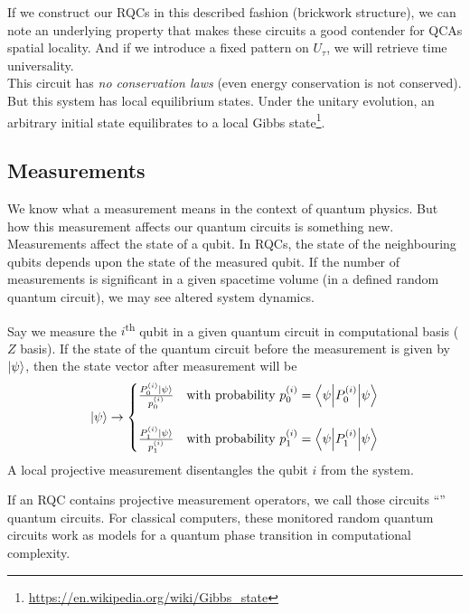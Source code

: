 \documentclass[11pt, oneside, listof=totoc]{scrbook}
\renewcommand{\u}{0}
\renewcommand{\d}{1}
\begin{document}
If we construct our RQCs in this described fashion (\ie brickwork structure), we can note an underlying property that makes these circuits a good contender for QCAs \ie spatial locality. And if we introduce a fixed pattern on \(U_\tau\), we will retrieve time universality.\\

This circuit has \emph{no conservation laws} (even energy conservation is not conserved). But this system has local equilibrium states. Under the unitary evolution, an arbitrary initial state equilibrates to a local Gibbs state\footnote{\url{https://en.wikipedia.org/wiki/Gibbs_state}}.

\subsection{Measurements}\label{ssec:measurement}

We know what a measurement means in the context of quantum physics. But how this measurement affects our quantum circuits is something new. Measurements affect the state of a qubit. In RQCs, the state of the neighbouring qubits depends upon the state of the measured qubit. If the number of measurements is significant in a given spacetime volume (\ie in a defined random quantum circuit), we may see altered system dynamics.

Say we measure the \(i\)\textsuperscript{th} qubit in a given quantum circuit in computational basis (\ie \(Z\) basis). If the state of the quantum circuit before the measurement is given by \(\ket{\psi}\), then the state vector after measurement will be
\begin{equation}
    \ket{\psi} \to \begin{cases}
        \frac{P_\u^{(i)} \ket{\psi}}{p_\u^{(i)}} & \text{with probability \(p_\u^{(i)} = \ev**{P_\u^{(i)}}{\psi}\)} \\[4ex]
        \frac{P_\d^{(i)} \ket{\psi}}{p_\d^{(i)}} & \text{with probability \(p_\d^{(i)} = \ev**{P_\d^{(i)}}{\psi}\)}
    \end{cases}
\end{equation}
A local projective measurement disentangles the qubit \(i\) from the system.

If an RQC contains projective measurement operators, we call those circuits ``'' quantum circuits. For classical computers, these monitored random quantum circuits work as models for a quantum phase transition in computational complexity.
\end{document}
